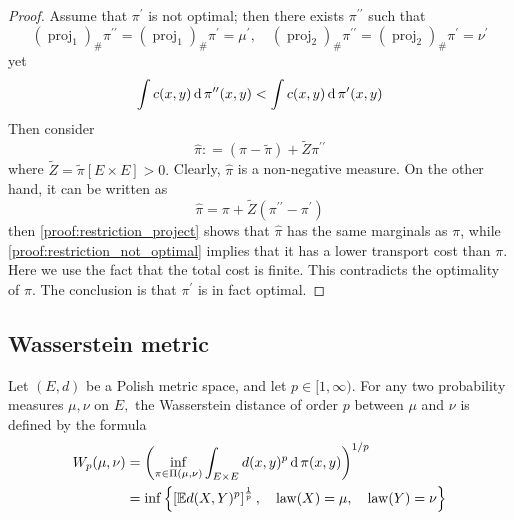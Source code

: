 \begin{proof}
	Assume that \( \pi ^ { \prime } \) is not optimal;
	then there exists
	\( \pi ^ { \prime \prime } \) such that
	\begin{equation}
		\label{proof:restriction_project}
		\left( \operatorname { proj } _ { 1 } \right) _ { \# } \pi ^ { \prime \prime } = \left( \operatorname { proj } _ { 1 } \right) _ { \# } \pi ^ { \prime } = \mu ^ { \prime },
		\quad \left( \operatorname { proj } _ { 2 } \right) _ { \# } \pi ^ { \prime \prime } = \left( \operatorname { proj } _ { 2 } \right) _ { \# } \pi ^ { \prime } = \nu ^ { \prime }
	\end{equation}
	yet
	\begin{equation}
		\label{proof:restriction_not_optimal}
		\int c ( x , y ) \operatorname{d} \pi ^ { \prime \prime } ( x , y ) < \int c ( x , y ) \operatorname{d} \pi ^ { \prime } ( x , y )
	\end{equation}
	Then consider
	\[ \widehat { \pi } : = ( \pi - \widetilde { \pi } ) + \widetilde { Z } \pi ^ { \prime \prime } \]
	where \( \widetilde { Z } = \widetilde { \pi } [ E \times E ] > 0 . \) Clearly, \( \widehat { \pi } \) is a non-negative measure. On the
	other hand, it can be written as
	\[ \widehat { \pi } = \pi + \widetilde { Z } \left( \pi ^ { \prime \prime } - \pi ^ { \prime } \right) \]
	then \cref{proof:restriction_project} shows that \( \widehat { \pi } \) has the same marginals as \( \pi \),
	while \cref{proof:restriction_not_optimal} implies that it has a lower transport cost than \( \pi \).
	Here we use the fact that the total cost is finite.
	This contradicts the optimality of \( \pi \). The conclusion
	is that \( \pi ^ { \prime } \) is in fact optimal.
\end{proof}

\subsection{Wasserstein metric}

\begin{defn}
	\label{Wasserstein_distance}
	Let  \(( E , d ) \) be a Polish metric space, and let \( p \in [ 1 , \infty ) . \) For any two probability measures \( \mu , \nu \) on \( E , \) the Wasserstein distance of order \( p \) between \( \mu \) and \( \nu \) is defined by the formula
	\begin{align*}
		W _ { p } ( \mu , \nu )
		& = \left( \inf _ { \pi \in \Pi ( \mu , \nu ) } \int _ { E \times E } d ( x , y ) ^ { p } \operatorname{d} \pi ( x , y ) \right) ^ { 1 / p  } \\
		& = \inf \left\{ \left[ \mathbb{ E } d ( X , Y ) ^ { p } \right] ^ { \frac { 1 } { p } } , \quad \operatorname { law } ( X ) = \mu , \quad \operatorname { law } ( Y ) = \nu \right\}
	\end{align*}
\end{defn}

